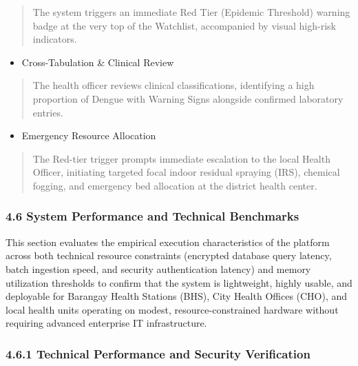 \documentclass[
]{article}
\begin{document}
\begin{quote}
The system triggers an immediate Red Tier (Epidemic Threshold) warning
badge at the very top of the Watchlist, accompanied by visual high-risk
indicators.
\end{quote}

\begin{itemize}
\item
  Cross-Tabulation \& Clinical Review
\end{itemize}

\begin{quote}
The health officer reviews clinical classifications, identifying a high
proportion of Dengue with Warning Signs alongside confirmed laboratory
entries.
\end{quote}

\begin{itemize}
\item
  Emergency Resource Allocation
\end{itemize}

\begin{quote}
The Red-tier trigger prompts immediate escalation to the local Health
Officer, initiating targeted focal indoor residual spraying (IRS),
chemical fogging, and emergency bed allocation at the district health
center.
\end{quote}

\subsubsection{\texorpdfstring{\textbf{4.6 System Performance and
Technical
Benchmarks}}{4.6 System Performance and Technical Benchmarks}}\label{system-performance-and-technical-benchmarks}

This section evaluates the empirical execution characteristics of the
platform across both technical resource constraints (encrypted database
query latency, batch ingestion speed, and security authentication
latency) and memory utilization thresholds to confirm that the system is
lightweight, highly usable, and deployable for Barangay Health Stations
(BHS), City Health Offices (CHO), and local health units operating on
modest, resource-constrained hardware without requiring advanced
enterprise IT infrastructure.

\subsubsection{\texorpdfstring{\textbf{4.6.1 Technical Performance and
Security Verification}
}{4.6.1 Technical Performance and Security Verification }}\label{technical-performance-and-security-verification}
\end{document}

